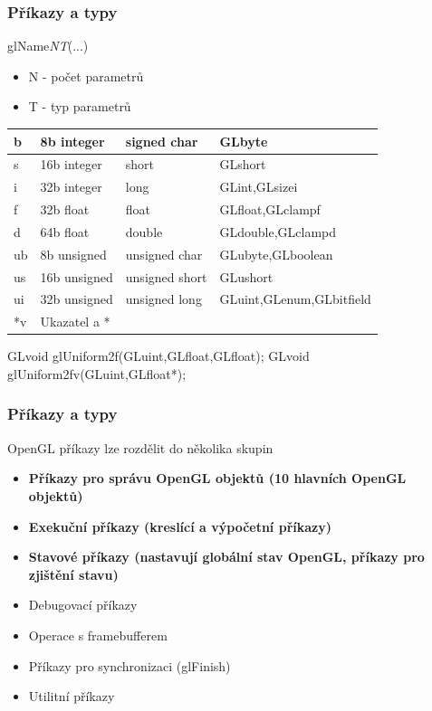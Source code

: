 \begin{frame}
\frametitle{Příkazy a typy}
  glName{\it NT}(...)
  \begin{itemize}
    \item N - počet parametrů
    \item T - typ parametrů
  \end{itemize}
    \begin{tabular}{|l|l|l|l|}
    \hline
    b & 8b integer & signed char & GLbyte \\ \hline
    s & 16b integer & short & GLshort \\ \hline
    i & 32b integer & long & GLint,GLsizei \\ \hline
    f & 32b float & float & GLfloat,GLclampf \\ \hline
    d & 64b float & double & GLdouble,GLclampd \\ \hline
    ub & 8b unsigned & unsigned char & GLubyte,GLboolean \\ \hline
    us & 16b unsigned & unsigned short & GLushort \\ \hline
    ui & 32b unsigned & unsigned long & GLuint,GLenum,GLbitfield \\ \hline
    *v & Ukazatel a * & & \\ \hline
    \end{tabular}
    GLvoid glUniform2f(GLuint,GLfloat,GLfloat);
    GLvoid glUniform2fv(GLuint,GLfloat*);
\end{frame}

\begin{frame}
\frametitle{Příkazy a typy}
  OpenGL příkazy lze rozdělit do několika skupin
  \begin{itemize}
    \item \textbf{Příkazy pro správu OpenGL objektů (10 hlavních OpenGL objektů)}
    \item \textbf{Exekuční příkazy (kreslící a výpočetní příkazy)}
    \item \textbf{Stavové příkazy (nastavují globální stav OpenGL, příkazy pro zjištění stavu)}
    \item Debugovací příkazy
    \item Operace s framebufferem
    \item Příkazy pro synchronizaci (glFinish)
    \item Utilitní příkazy
  \end{itemize}
\end{frame}


